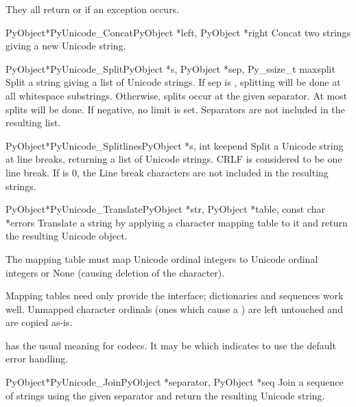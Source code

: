 They all return \NULL{} or  if an exception occurs.

\begin{cfuncdesc}{PyObject*}{PyUnicode_Concat}{PyObject *left,
                                               PyObject *right}
  Concat two strings giving a new Unicode string.
\end{cfuncdesc}

\begin{cfuncdesc}{PyObject*}{PyUnicode_Split}{PyObject *s,
                                              PyObject *sep,
                                              Py_ssize_t maxsplit}
  Split a string giving a list of Unicode strings.  If sep is \NULL{},
  splitting will be done at all whitespace substrings.  Otherwise,
  splits occur at the given separator.  At most  splits
  will be done.  If negative, no limit is set.  Separators are not
  included in the resulting list.
\end{cfuncdesc}

\begin{cfuncdesc}{PyObject*}{PyUnicode_Splitlines}{PyObject *s,
                                                   int keepend}
  Split a Unicode string at line breaks, returning a list of Unicode
  strings.  CRLF is considered to be one line break.  If 
  is 0, the Line break characters are not included in the resulting
  strings.
\end{cfuncdesc}

\begin{cfuncdesc}{PyObject*}{PyUnicode_Translate}{PyObject *str,
                                                  PyObject *table,
                                                  const char *errors}
  Translate a string by applying a character mapping table to it and
  return the resulting Unicode object.

  The mapping table must map Unicode ordinal integers to Unicode
  ordinal integers or None (causing deletion of the character).

  Mapping tables need only provide the 
  interface; dictionaries and sequences work well.  Unmapped character
  ordinals (ones which cause a ) are left
  untouched and are copied as-is.

   has the usual meaning for codecs. It may be \NULL{}
  which indicates to use the default error handling.
\end{cfuncdesc}

\begin{cfuncdesc}{PyObject*}{PyUnicode_Join}{PyObject *separator,
                                             PyObject *seq}
  Join a sequence of strings using the given separator and return the
  resulting Unicode string.
\end{cfuncdesc}

